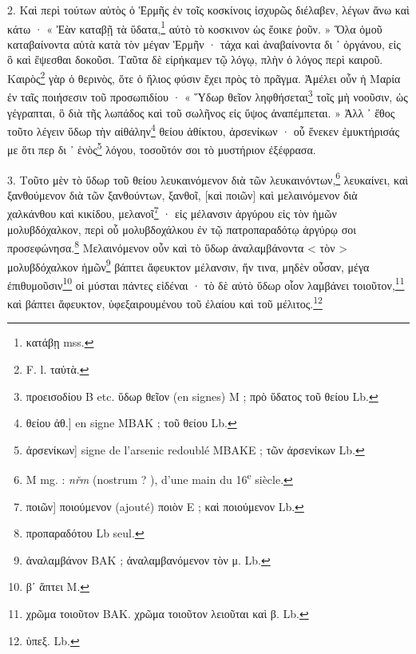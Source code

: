 \documentclass[a4paper, 11pt, oneside, polutonikogreek, french]{article}
\begin{document}
2. Καὶ περὶ τούτων αὐτὸς ὁ Ἑρμῆς ἐν τοῖς κοσκίνοις ἰσχυρῶς διέλαβεν, λέγων ἄνω καὶ κάτω · « Ἐὰν καταβῇ τὰ ὕδατα,\footnote{κατάβῃ mss.} αὐτὸ τὸ κοσκινον ὡς ἔοικε ῥοῦν. » Ὅλα ὁμοῦ καταβαίνοντα αὐτὰ κατὰ τὸν μέγαν Ἑρμῆν · τάχα καὶ ἀναβαίνοντα δι ᾽ ὀργάνου, εἰς ὃ καὶ ἕψεσθαι δοκοῦσι. Ταῦτα δὲ εἰρήκαμεν τῷ λόγῳ, πλὴν ὁ λόγος περὶ καιροῦ. Καιρὸς\footnote{F. l. ταὐτὰ.} γὰρ ὁ θερινὸς, ὅτε ὁ ἥλιος φύσιν ἔχει πρὸς τὸ πρᾶγμα. Ἀμέλει οὖν ἡ Μαρία ἐν ταῖς ποιήσεσιν τοῦ προσωπιδίου · « Ὕδωρ θεῖον ληφθήσεται\footnote{προεισοδίου B etc. ὕδωρ θεῖον (en signes) M ; πρὸ ὕδατος τοῦ θείου Lb.} τοῖς μὴ νοοῦσιν, ὡς γέγραπται, ὃ διὰ τῆς λωπάδος καὶ τοῦ σωλῆνος εἰς ὕψος ἀναπέμπεται. » Ἀλλ ᾽ ἔθος τοῦτο λέγειν ὕδωρ τὴν αἰθάλην\footnote{θείου ἀθ.] en signe MBAK ; τοῦ θείου Lb.} θείου ἀθίκτου, ἀρσενίκων · οὗ ἕνεκεν ἐμυκτήρισάς με ὅτι περ δι ᾽ ἑνὸς\footnote{ἀρσενίκων] signe de l'arsenic redoublé MBAKE ; τῶν ἀρσενίκων Lb.} λόγου, τοσοῦτόν σοι τὸ μυστήριον ἐξέφρασα.

3. Τοῦτο μὲν τὸ ὕδωρ τοῦ θείου λευκαινόμενον διὰ τῶν λευκαινόντων,\footnote{M mg. : \emph{nřm} (nostrum ? ), d'une main du 16\textsuperscript{e} siècle.} λευκαίνει, καὶ ξανθούμενον διὰ τῶν ξανθούντων, ξανθοῖ, [καὶ ποιῶν] καὶ μελαινόμενον διὰ χαλκάνθου καὶ κικίδου, μελανοῖ\footnote{ποιῶν] ποιούμενον (ajouté) ποιὸν E ; καὶ ποιούμενον Lb.} · εἰς μέλανσιν ἀργύρου εἰς τὸν ἡμῶν μολυβδόχαλκον, περὶ οὗ μολυβδοχάλκου ἐν τῷ πατροπαραδότῳ ἀργύρῳ σοι προσεφώνησα.\footnote{προπαραδότου Lb seul.} Μελαινόμενον οὖν καὶ τὸ ὕδωρ ἀναλαμβάνοντα < τὸν > μολυβδόχαλκον ἡμῶν\footnote{ἀναλαμβάνον BAK ; ἀναλαμβανόμενον τὸν μ. Lb.} βάπτει ἄφευκτον μέλανσιν, ἥν τινα, μηδὲν οὖσαν, μέγα ἐπιθυμοῦσιν\footnote{βʹ ἅπτει M.} οἱ μύσται πάντες εἰδέναι · τὸ δὲ αὐτὸ ὕδωρ οἷον λαμβάνει τοιοῦτον,\footnote{χρῶμα τοιοῦτον BAK. χρῶμα τοιοῦτον λειοῦται καὶ β. Lb.} καὶ βάπτει ἄφευκτον, ὑφεξαιρουμένου τοῦ ἐλαίου καὶ τοῦ μέλιτος.\footnote{ὑπεξ. Lb.}
\end{document}
